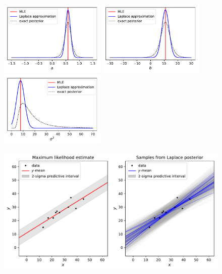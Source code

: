 \begin{figure}[h]
	\centering
		\includegraphics[width=0.45\textwidth]{./figs/06-a.pdf}
		\includegraphics[width=0.45\textwidth]{./figs/06-b.pdf}\\
		\includegraphics[width=0.45\textwidth]{./figs/06-sigma2.pdf}
\end{figure}
\begin{figure}[h]
	\centering
		\includegraphics[width=\textwidth]{./figs/06-linear-regression.pdf}
\end{figure}











